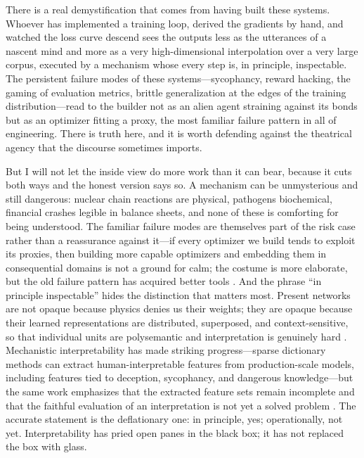 \documentclass[11pt]{article}
\begin{document}
There is a real demystification that comes from having built these systems. Whoever has implemented a training loop, derived the gradients by hand, and watched the loss curve descend sees the outputs less as the utterances of a nascent mind and more as a very high-dimensional interpolation over a very large corpus, executed by a mechanism whose every step is, in principle, inspectable. The persistent failure modes of these systems---sycophancy, reward hacking, the gaming of evaluation metrics, brittle generalization at the edges of the training distribution---read to the builder not as an alien agent straining against its bonds but as an optimizer fitting a proxy, the most familiar failure pattern in all of engineering. There is truth here, and it is worth defending against the theatrical agency that the discourse sometimes imports.

But I will not let the inside view do more work than it can bear, because it cuts both ways and the honest version says so. A mechanism can be unmysterious and still dangerous: nuclear chain reactions are physical, pathogens biochemical, financial crashes legible in balance sheets, and none of these is comforting for being understood. The familiar failure modes are themselves part of the risk case rather than a reassurance against it---if every optimizer we build tends to exploit its proxies, then building more capable optimizers and embedding them in consequential domains is not a ground for calm; the costume is more elaborate, but the old failure pattern has acquired better tools \citep{amodei2016, hubinger2019}. And the phrase ``in principle inspectable'' hides the distinction that matters most. Present networks are not opaque because physics denies us their weights; they are opaque because their learned representations are distributed, superposed, and context-sensitive, so that individual units are polysemantic and interpretation is genuinely hard \citep{elhage2022}. Mechanistic interpretability has made striking progress---sparse dictionary methods can extract human-interpretable features from production-scale models, including features tied to deception, sycophancy, and dangerous knowledge---but the same work emphasizes that the extracted feature sets remain incomplete and that the faithful evaluation of an interpretation is not yet a solved problem \citep{templeton2024}. The accurate statement is the deflationary one: in principle, yes; operationally, not yet. Interpretability has pried open panes in the black box; it has not replaced the box with glass.
\end{document}
